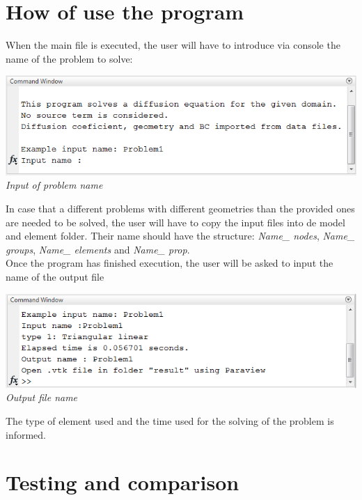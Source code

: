 \documentclass[paper=a4, fontsize=11pt]{article} %
\numberwithin{equation}{section} %
\numberwithin{figure}{section} %
\numberwithin{table}{section} %
\begin{document}
\section{\textbf{How of use the program}}

When the main file is executed, the user will have to introduce via console the name of the problem to solve:

\begin{center}
\includegraphics[scale=.75]{input}\\
\textit{Input of problem name}
\end{center}

In case that a different problems with  different geometries than the provided ones are needed to be solved, the user will have to copy the input files into de model and element folder. Their name should have the structure: \textit{Name\_ nodes}, \textit{Name\_ groups}, \textit{Name\_ elements} and \textit{Name\_ prop}.\\

Once the program has finished execution, the user will be asked to input the name of the output file

\begin{center}
\includegraphics[scale=.75]{output}\\
\textit{Output file name}
\end{center}

The type of element used and the time used for the solving of the problem is informed.

\section{\textbf{Testing and comparison}}
\end{document}
